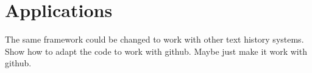 \section{Applications}

The same framework could be changed to work with other text history
systems. Show how to adapt the code to work with github. Maybe just
make it work with github.
